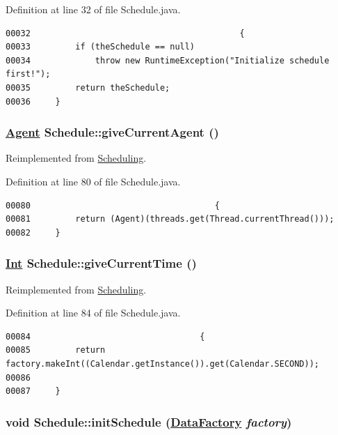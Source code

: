 Definition at line 32 of file Schedule.java.\footnotesize\begin{verbatim}00032                                          {
00033         if (theSchedule == null)
00034             throw new RuntimeException("Initialize schedule first!");
00035         return theSchedule;
00036     }
\end{verbatim}\normalsize 
\hypertarget{classSchedule_a4}{
\subsubsection[giveCurrentAgent]{\setlength{\rightskip}{0pt plus 5cm}\hyperlink{interfaceAgent}{Agent} Schedule::give\-Current\-Agent ()}}
\label{classSchedule_a4}




Reimplemented from \hyperlink{interfaceScheduling_a4}{Scheduling}.

Definition at line 80 of file Schedule.java.\footnotesize\begin{verbatim}00080                                     {
00081         return (Agent)(threads.get(Thread.currentThread()));
00082     }
\end{verbatim}\normalsize 
\hypertarget{classSchedule_a5}{
\subsubsection[giveCurrentTime]{\setlength{\rightskip}{0pt plus 5cm}\hyperlink{interfaceInt}{Int} Schedule::give\-Current\-Time ()}}
\label{classSchedule_a5}




Reimplemented from \hyperlink{interfaceScheduling_a5}{Scheduling}.

Definition at line 84 of file Schedule.java.\footnotesize\begin{verbatim}00084                                  {
00085         return factory.makeInt((Calendar.getInstance()).get(Calendar.SECOND));
00086 
00087     }
\end{verbatim}\normalsize 
\hypertarget{classSchedule_d0}{
\subsubsection[initSchedule]{\setlength{\rightskip}{0pt plus 5cm}void Schedule::init\-Schedule (\hyperlink{interfaceDataFactory}{Data\-Factory} {\em factory})}}
\label{classSchedule_d0}




